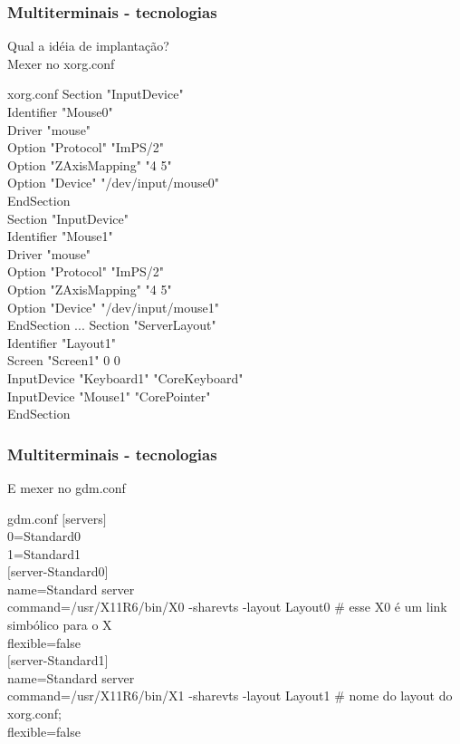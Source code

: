 \documentclass[utf8,9pt]{beamer}
\begin{document}
	  \begin{frame}
		  \frametitle{Multiterminais - tecnologias}
		  Qual a idéia de implantação? \\
		  Mexer no xorg.conf
		  \begin{small}
		  \begin{block}{xorg.conf}
			  Section "InputDevice" \\
			  Identifier "Mouse0"\\
			  Driver "mouse" \\
			  Option "Protocol" "ImPS/2" \\
			  Option "ZAxisMapping" "4 5" \\
			  Option "Device" "/dev/input/mouse0" \\
			  EndSection \\
			  Section "InputDevice"\\
			  Identifier "Mouse1"\\
			  Driver "mouse"\\
			  Option "Protocol" "ImPS/2"\\
			  Option "ZAxisMapping" "4 5"\\
			  Option "Device" "/dev/input/mouse1"\\
			  EndSection
			  ...
			  Section "ServerLayout"\\
			  Identifier "Layout1"\\
			  Screen "Screen1" 0 0\\
			  InputDevice "Keyboard1" "CoreKeyboard"\\
			  InputDevice "Mouse1" "CorePointer"\\
			  EndSection
		  \end{block}
		  \end{small}
	  \end{frame}

	  \begin{frame}
		  \frametitle{Multiterminais - tecnologias}
		  E mexer no gdm.conf
		  \begin{block}{gdm.conf}
		  $[$servers$]$\\

		  0=Standard0\\
		  1=Standard1\\

		  $[$server-Standard0$]$\\
		  name=Standard server\\
		  command=/usr/X11R6/bin/X0 -sharevts -layout Layout0 \# esse X0 é um link simbólico para o X\\
		  flexible=false\\

		  $[$server-Standard1$]$\\
		  name=Standard server\\
		  command=/usr/X11R6/bin/X1 -sharevts -layout Layout1 \# nome do layout do xorg.conf;\\
		  flexible=false
		  \end{block}
	  \end{frame}
\end{document}
